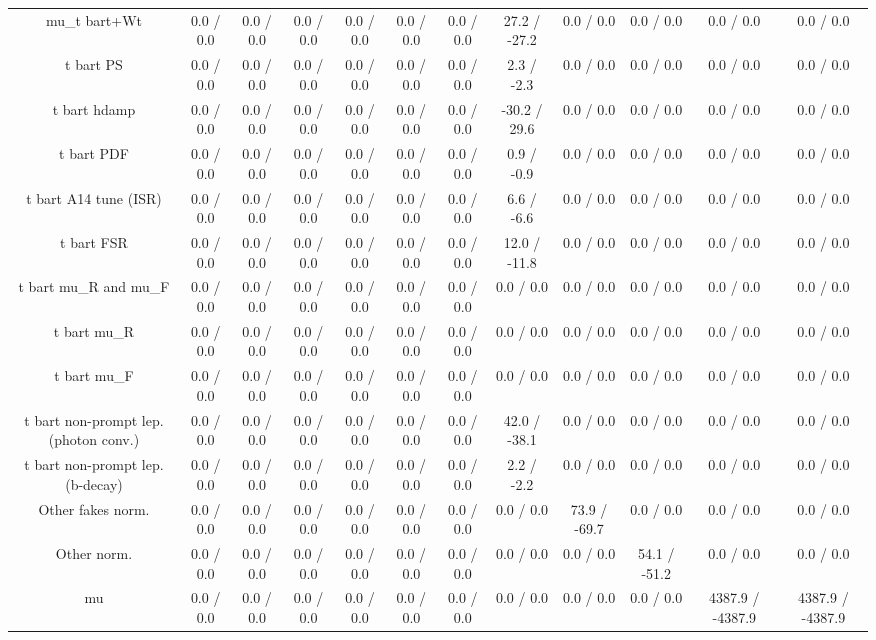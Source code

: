 \begin{table}[htbp]
\begin{center}
\begin{tabular}{|c|c|c|c|c|c|c|c|c|c|c|c|}
   mu_{t bar{t}+Wt} & 0.0 / 0.0 & 0.0 / 0.0 & 0.0 / 0.0 & 0.0 / 0.0 & 0.0 / 0.0 & 0.0 / 0.0 & 27.2 / -27.2 & 0.0 / 0.0 & 0.0 / 0.0 & 0.0 / 0.0 & 0.0 / 0.0 \\ 
  t bar{t} PS & 0.0 / 0.0 & 0.0 / 0.0 & 0.0 / 0.0 & 0.0 / 0.0 & 0.0 / 0.0 & 0.0 / 0.0 & 2.3 / -2.3 & 0.0 / 0.0 & 0.0 / 0.0 & 0.0 / 0.0 & 0.0 / 0.0 \\ 
  t bar{t} hdamp & 0.0 / 0.0 & 0.0 / 0.0 & 0.0 / 0.0 & 0.0 / 0.0 & 0.0 / 0.0 & 0.0 / 0.0 & -30.2 / 29.6 & 0.0 / 0.0 & 0.0 / 0.0 & 0.0 / 0.0 & 0.0 / 0.0 \\ 
  t bar{t} PDF & 0.0 / 0.0 & 0.0 / 0.0 & 0.0 / 0.0 & 0.0 / 0.0 & 0.0 / 0.0 & 0.0 / 0.0 & 0.9 / -0.9 & 0.0 / 0.0 & 0.0 / 0.0 & 0.0 / 0.0 & 0.0 / 0.0 \\ 
  t bar{t} A14 tune (ISR) & 0.0 / 0.0 & 0.0 / 0.0 & 0.0 / 0.0 & 0.0 / 0.0 & 0.0 / 0.0 & 0.0 / 0.0 & 6.6 / -6.6 & 0.0 / 0.0 & 0.0 / 0.0 & 0.0 / 0.0 & 0.0 / 0.0 \\ 
  t bar{t} FSR & 0.0 / 0.0 & 0.0 / 0.0 & 0.0 / 0.0 & 0.0 / 0.0 & 0.0 / 0.0 & 0.0 / 0.0 & 12.0 / -11.8 & 0.0 / 0.0 & 0.0 / 0.0 & 0.0 / 0.0 & 0.0 / 0.0 \\ 
  t bar{t}  mu_{R} and  mu_{F} & 0.0 / 0.0 & 0.0 / 0.0 & 0.0 / 0.0 & 0.0 / 0.0 & 0.0 / 0.0 & 0.0 / 0.0 & 0.0 / 0.0 & 0.0 / 0.0 & 0.0 / 0.0 & 0.0 / 0.0 & 0.0 / 0.0 \\ 
  t bar{t}  mu_{R} & 0.0 / 0.0 & 0.0 / 0.0 & 0.0 / 0.0 & 0.0 / 0.0 & 0.0 / 0.0 & 0.0 / 0.0 & 0.0 / 0.0 & 0.0 / 0.0 & 0.0 / 0.0 & 0.0 / 0.0 & 0.0 / 0.0 \\ 
  t bar{t}  mu_{F} & 0.0 / 0.0 & 0.0 / 0.0 & 0.0 / 0.0 & 0.0 / 0.0 & 0.0 / 0.0 & 0.0 / 0.0 & 0.0 / 0.0 & 0.0 / 0.0 & 0.0 / 0.0 & 0.0 / 0.0 & 0.0 / 0.0 \\ 
  t bar{t} non-prompt lep. (photon conv.) & 0.0 / 0.0 & 0.0 / 0.0 & 0.0 / 0.0 & 0.0 / 0.0 & 0.0 / 0.0 & 0.0 / 0.0 & 42.0 / -38.1 & 0.0 / 0.0 & 0.0 / 0.0 & 0.0 / 0.0 & 0.0 / 0.0 \\ 
  t bar{t} non-prompt lep. (b-decay) & 0.0 / 0.0 & 0.0 / 0.0 & 0.0 / 0.0 & 0.0 / 0.0 & 0.0 / 0.0 & 0.0 / 0.0 & 2.2 / -2.2 & 0.0 / 0.0 & 0.0 / 0.0 & 0.0 / 0.0 & 0.0 / 0.0 \\ 
  Other fakes norm. & 0.0 / 0.0 & 0.0 / 0.0 & 0.0 / 0.0 & 0.0 / 0.0 & 0.0 / 0.0 & 0.0 / 0.0 & 0.0 / 0.0 & 73.9 / -69.7 & 0.0 / 0.0 & 0.0 / 0.0 & 0.0 / 0.0 \\ 
  Other norm. & 0.0 / 0.0 & 0.0 / 0.0 & 0.0 / 0.0 & 0.0 / 0.0 & 0.0 / 0.0 & 0.0 / 0.0 & 0.0 / 0.0 & 0.0 / 0.0 & 54.1 / -51.2 & 0.0 / 0.0 & 0.0 / 0.0 \\ 
  mu & 0.0 / 0.0 & 0.0 / 0.0 & 0.0 / 0.0 & 0.0 / 0.0 & 0.0 / 0.0 & 0.0 / 0.0 & 0.0 / 0.0 & 0.0 / 0.0 & 0.0 / 0.0 & 4387.9 / -4387.9 & 4387.9 / -4387.9 \\ 

\end{tabular}
\end{center}
\end{table}
